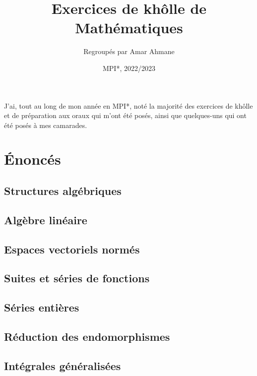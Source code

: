 \documentclass[12pt]{scrartcl}
\title{Exercices de khôlle de Mathématiques}
\author{Regroupés par Amar Ahmane}
\date{MPI*, 2022/2023}
\begin{document}
    \maketitle
    \begin{center}
        \footnotesize J'ai, tout au long de mon année en MPI*, 
        noté la majorité des exercices de khôlle et de préparation aux oraux qui 
        m'ont été posés, ainsi que quelques-uns qui ont été posés à mes camarades.
    \end{center}

    \tableofcontents

    \newpage
    
    \section{Énoncés}
    
    \subsection{Structures algébriques}
    

    \subsection{Algèbre linéaire}
    

    \subsection{Espaces vectoriels normés}
    

    \subsection{Suites et séries de fonctions}
    

    \subsection{Séries entières}
    

    \subsection{Réduction des endomorphismes}
    

    \subsection{Intégrales généralisées}
    
\end{document}
